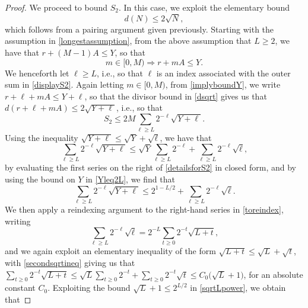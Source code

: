 \documentclass[10pt,a4paper]{amsart}
\begin{document}
\begin{proof}
 We proceed to bound $S_2$. In this case, we exploit the elementary bound
\begin{equation}\label{dsqrt}
 d(N) \leq 2 \sqrt{N}, 
\end{equation}
 which follows from a pairing argument given previously. Starting with the assumption in \eqref{longestassumption}, from the above 
 assumption that $L \geq 2$, we have that $ r + (M-1) A \leq Y$, so that 
\begin{equation}\label{implyboundY}
 m \in [0, M) \Longrightarrow r + m A \leq Y. 
\end{equation}
 We henceforth let $\ell \geq L$, i.e., so that $\ell$ is an index associated with the outer sum in \eqref{displayS2}. Again letting $m \in [0, 
 M)$, from \eqref{implyboundY}, we write $r + \ell + m A \leq Y + \ell$, so that the divisor bound in \eqref{dsqrt} gives us that $ d(r + 
 \ell + m A) \leq 2 \sqrt{Y + \ell}$, i.e., so that 
\begin{equation}\label{S2elementary}
 S_{2} \leq 2 M \sum_{\ell \geq L} 2^{-\ell} \sqrt{Y + \ell}. 
\end{equation}
 Using the inequality $\sqrt{Y + \ell} \leq \sqrt{Y} + \sqrt{\ell}$, we have that 
\begin{equation}\label{detailsforS2}
 \sum_{\ell \geq L} 2^{-\ell} \sqrt{Y + \ell}
 \leq \sqrt{Y} \sum_{\ell \geq L} 2^{-\ell} + \sum_{\ell \geq L} 2^{-\ell} \sqrt{\ell}, 
\end{equation}
 by evaluating the first series on the right of \eqref{detailsforS2} in closed form, and by using the bound on $Y$ in \eqref{Yleq2L}, we 
 find that 
\begin{equation}\label{toreindex}
 \sum_{\ell \geq L} 2^{-\ell} \sqrt{Y + \ell}
 \leq 2^{1 - L/2} + \sum_{\ell \geq L} 2^{-\ell} \sqrt{\ell}. 
\end{equation}
 We then apply a reindexing argument to the right-hand series in \eqref{toreindex}, writing
\begin{equation}\label{secondsqrtineq}
 \sum_{\ell \geq L} 2^{-\ell} \sqrt{\ell} = 
 2^{-L} \sum_{t \geq 0} 2^{-t} \sqrt{L + t}, 
\end{equation}
 and we again exploit an elementary inequality of the form $\sqrt{L + t} \leq \sqrt{L} + \sqrt{t}$, with \eqref{secondsqrtineq} giving us 
 that $ \sum_{t \geq 0} 2^{-t} \sqrt{L + t} \leq \sqrt{L} \sum_{t \geq 0} 2^{-t} + \sum_{t \geq 0} 2^{-t} \sqrt{t} 
 \leq C_0 \big( \sqrt{L} + 1 \big)$, 
 for an absolute constant $C_0$. 
 Exploiting the bound 
$\sqrt{L} + 1 \leq 2^{L/2}$ in \eqref{sqrtLpower}, we obtain that 

\end{proof}
\end{document}
